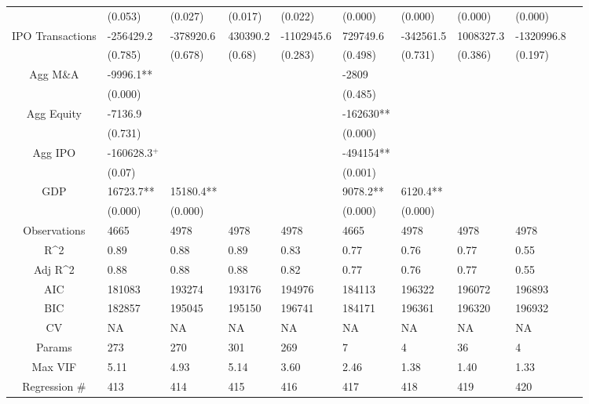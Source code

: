 \documentclass{article}
\begin{document}
\begin{table}[H]
\begin{tabular}{|clllllllll|}
   & (0.053) & (0.027) & (0.017) & (0.022) & (0.000) & (0.000) & (0.000) & (0.000) & \\ 
  IPO Transactions & -256429.2 & -378920.6 & 430390.2 & -1102945.6 & 729749.6 & -342561.5 & 1008327.3 & -1320996.8 & \\ 
   & (0.785) & (0.678) & (0.68) & (0.283) & (0.498) & (0.731) & (0.386) & (0.197) & \\ 
  Agg M\&A & -9996.1** &  &  &  & -2809 &  &  &  & \\ 
   & (0.000) &  &  &  & (0.485) &  &  &  & \\ 
  Agg Equity & -7136.9 &  &  &  & -162630** &  &  &  & \\ 
   & (0.731) &  &  &  & (0.000) &  &  &  & \\ 
  Agg IPO & -160628.3$^{+}$ &  &  &  & -494154** &  &  &  & \\ 
   & (0.07) &  &  &  & (0.001) &  &  &  & \\ 
  GDP & 16723.7** & 15180.4** &  &  & 9078.2** & 6120.4** &  &  & \\ 
   & (0.000) & (0.000) &  &  & (0.000) & (0.000) &  &  & \\ 
  \hline 
 Observations & 4665 & 4978 & 4978 & 4978 & 4665 & 4978 & 4978 & 4978 & \\ 
  R^2 & 0.89 & 0.88 & 0.89 & 0.83 & 0.77 & 0.76 & 0.77 & 0.55 & \\ 
  Adj R^2 & 0.88 & 0.88 & 0.88 & 0.82 & 0.77 & 0.76 & 0.77 & 0.55 & \\ 
  AIC & 181083 & 193274 & 193176 & 194976 & 184113 & 196322 & 196072 & 196893 & \\ 
  BIC & 182857 & 195045 & 195150 & 196741 & 184171 & 196361 & 196320 & 196932 & \\ 
  CV & NA & NA & NA & NA & NA & NA & NA & NA & \\ 
  Params & 273 & 270 & 301 & 269 & 7 & 4 & 36 & 4 & \\ 
  Max VIF & 5.11 & 4.93 & 5.14 & 3.60 & 2.46 & 1.38 & 1.40 & 1.33 & \\ 
  Regression \# & 413 & 414 & 415 & 416 & 417 & 418 & 419 & 420 & \\ 
   \hline
\end{tabular}
 
\end{table}
\end{document}
